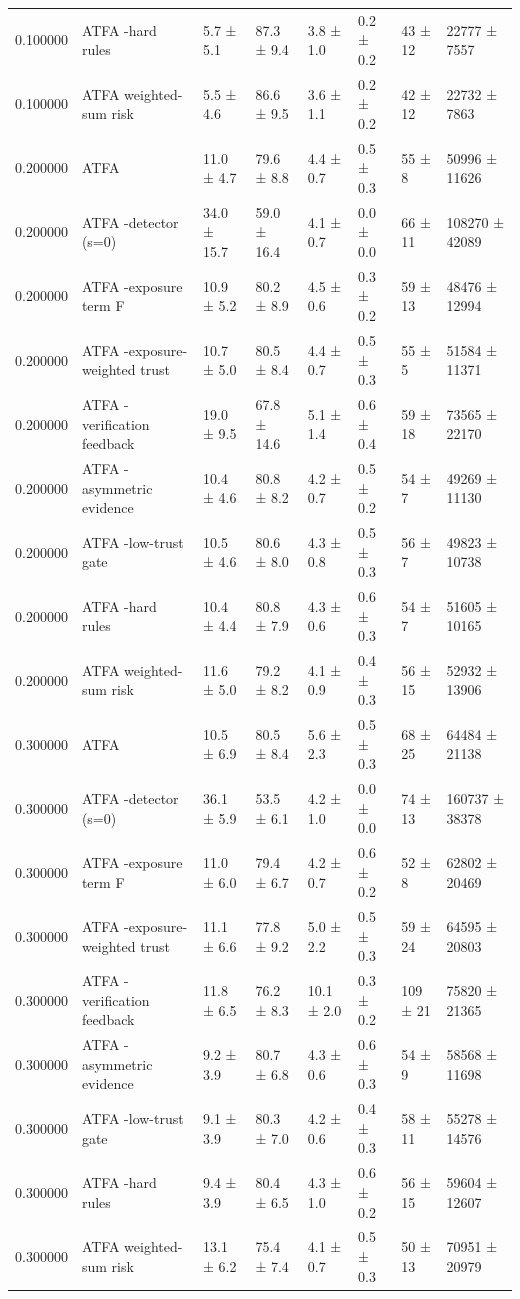 \begin{tabular}{rlllllll}
0.100000 & ATFA -hard rules & 5.7 ± 5.1 & 87.3 ± 9.4 & 3.8 ± 1.0 & 0.2 ± 0.2 & 43 ± 12 & 22777 ± 7557 \\
0.100000 & ATFA weighted-sum risk & 5.5 ± 4.6 & 86.6 ± 9.5 & 3.6 ± 1.1 & 0.2 ± 0.2 & 42 ± 12 & 22732 ± 7863 \\
0.200000 & ATFA & 11.0 ± 4.7 & 79.6 ± 8.8 & 4.4 ± 0.7 & 0.5 ± 0.3 & 55 ± 8 & 50996 ± 11626 \\
0.200000 & ATFA -detector (s=0) & 34.0 ± 15.7 & 59.0 ± 16.4 & 4.1 ± 0.7 & 0.0 ± 0.0 & 66 ± 11 & 108270 ± 42089 \\
0.200000 & ATFA -exposure term F & 10.9 ± 5.2 & 80.2 ± 8.9 & 4.5 ± 0.6 & 0.3 ± 0.2 & 59 ± 13 & 48476 ± 12994 \\
0.200000 & ATFA -exposure-weighted trust & 10.7 ± 5.0 & 80.5 ± 8.4 & 4.4 ± 0.7 & 0.5 ± 0.3 & 55 ± 5 & 51584 ± 11371 \\
0.200000 & ATFA -verification feedback & 19.0 ± 9.5 & 67.8 ± 14.6 & 5.1 ± 1.4 & 0.6 ± 0.4 & 59 ± 18 & 73565 ± 22170 \\
0.200000 & ATFA -asymmetric evidence & 10.4 ± 4.6 & 80.8 ± 8.2 & 4.2 ± 0.7 & 0.5 ± 0.2 & 54 ± 7 & 49269 ± 11130 \\
0.200000 & ATFA -low-trust gate & 10.5 ± 4.6 & 80.6 ± 8.0 & 4.3 ± 0.8 & 0.5 ± 0.3 & 56 ± 7 & 49823 ± 10738 \\
0.200000 & ATFA -hard rules & 10.4 ± 4.4 & 80.8 ± 7.9 & 4.3 ± 0.6 & 0.6 ± 0.3 & 54 ± 7 & 51605 ± 10165 \\
0.200000 & ATFA weighted-sum risk & 11.6 ± 5.0 & 79.2 ± 8.2 & 4.1 ± 0.9 & 0.4 ± 0.3 & 56 ± 15 & 52932 ± 13906 \\
0.300000 & ATFA & 10.5 ± 6.9 & 80.5 ± 8.4 & 5.6 ± 2.3 & 0.5 ± 0.3 & 68 ± 25 & 64484 ± 21138 \\
0.300000 & ATFA -detector (s=0) & 36.1 ± 5.9 & 53.5 ± 6.1 & 4.2 ± 1.0 & 0.0 ± 0.0 & 74 ± 13 & 160737 ± 38378 \\
0.300000 & ATFA -exposure term F & 11.0 ± 6.0 & 79.4 ± 6.7 & 4.2 ± 0.7 & 0.6 ± 0.2 & 52 ± 8 & 62802 ± 20469 \\
0.300000 & ATFA -exposure-weighted trust & 11.1 ± 6.6 & 77.8 ± 9.2 & 5.0 ± 2.2 & 0.5 ± 0.3 & 59 ± 24 & 64595 ± 20803 \\
0.300000 & ATFA -verification feedback & 11.8 ± 6.5 & 76.2 ± 8.3 & 10.1 ± 2.0 & 0.3 ± 0.2 & 109 ± 21 & 75820 ± 21365 \\
0.300000 & ATFA -asymmetric evidence & 9.2 ± 3.9 & 80.7 ± 6.8 & 4.3 ± 0.6 & 0.6 ± 0.3 & 54 ± 9 & 58568 ± 11698 \\
0.300000 & ATFA -low-trust gate & 9.1 ± 3.9 & 80.3 ± 7.0 & 4.2 ± 0.6 & 0.4 ± 0.3 & 58 ± 11 & 55278 ± 14576 \\
0.300000 & ATFA -hard rules & 9.4 ± 3.9 & 80.4 ± 6.5 & 4.3 ± 1.0 & 0.6 ± 0.2 & 56 ± 15 & 59604 ± 12607 \\
0.300000 & ATFA weighted-sum risk & 13.1 ± 6.2 & 75.4 ± 7.4 & 4.1 ± 0.7 & 0.5 ± 0.3 & 50 ± 13 & 70951 ± 20979 \\
\bottomrule
\end{tabular}
